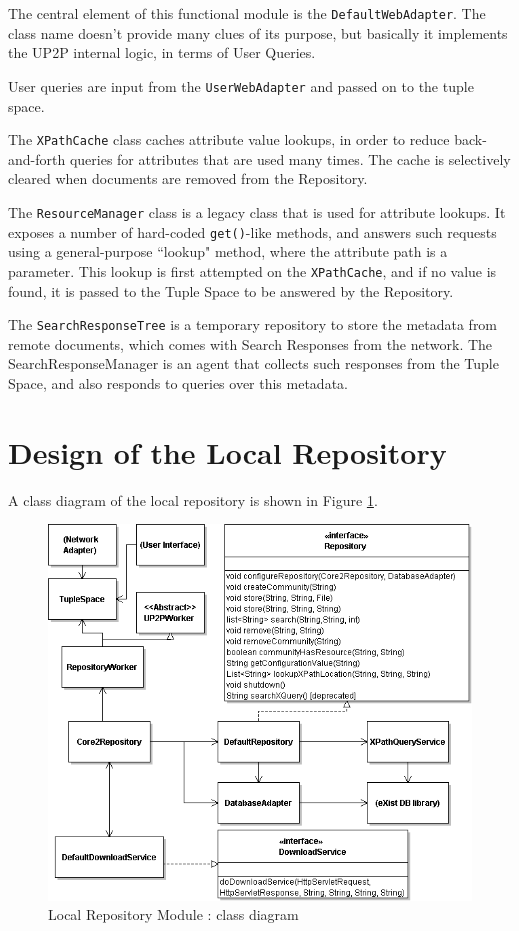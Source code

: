 \documentclass[titlepage]{article}%
\begin{document}
The central element of this functional module is the \verb.DefaultWebAdapter.. The class name doesn't provide many clues of its purpose, but basically it implements the UP2P internal logic, in terms of User Queries.

User queries are input from the \verb.UserWebAdapter. and passed on to the tuple space. 

The \verb.XPathCache. class caches attribute value lookups, in order to reduce back-and-forth queries for attributes that are used many times. The cache is selectively cleared when documents are removed from the Repository.

The \verb.ResourceManager. class is a legacy class that is used for attribute lookups. It exposes a number of hard-coded \verb.get().-like methods, and answers such requests using a general-purpose ``lookup" method, where the attribute path is a parameter. This lookup is first attempted on the \verb.XPathCache., and if no value is found, it is passed to the Tuple Space to be answered by the Repository.

The \verb.SearchResponseTree. is a temporary repository to store the metadata from remote documents, which comes with Search Responses from the network.
The SearchResponseManager is an agent that collects such responses from the Tuple Space, and also responds to queries over this metadata.
 
\section{Design of the Local Repository}
\label{sec:RepositoryDesign}

A class diagram of the local repository is shown in Figure \ref{fig:repositoryClass}.

\begin{figure}[htb]
\centering
	\includegraphics[scale=0.5]{diagrams/UP2PRepositoryClasses.png}
	\caption{Local Repository Module : class diagram}
	\label{fig:repositoryClass}
\end{figure}
\end{document}
